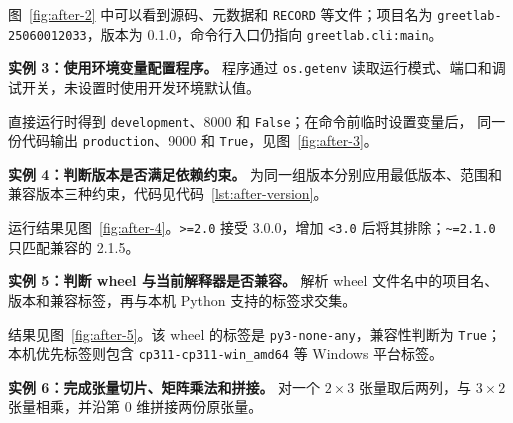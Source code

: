 \documentclass[12pt,a4paper,fontset=fandol]{ctexart}
\begin{document}
图~\ref{fig:after-2} 中可以看到源码、元数据和 \texttt{RECORD} 等文件；项目名为
\texttt{greetlab-25060012033}，版本为 0.1.0，命令行入口仍指向
\texttt{greetlab.cli:main}。


\noindent\textbf{实例 3：使用环境变量配置程序。}
程序通过 \texttt{os.getenv} 读取运行模式、端口和调试开关，未设置时使用开发环境默认值。



直接运行时得到 \texttt{development}、8000 和 \texttt{False}；在命令前临时设置变量后，
同一份代码输出 \texttt{production}、9000 和 \texttt{True}，见图~\ref{fig:after-3}。


\noindent\textbf{实例 4：判断版本是否满足依赖约束。}
为同一组版本分别应用最低版本、范围和兼容版本三种约束，代码见代码~\ref{lst:after-version}。



运行结果见图~\ref{fig:after-4}。\texttt{>=2.0} 接受 3.0.0，增加
\texttt{<3.0} 后将其排除；\texttt{\textasciitilde=2.1.0} 只匹配兼容的 2.1.5。


\noindent\textbf{实例 5：判断 wheel 与当前解释器是否兼容。}
解析 wheel 文件名中的项目名、版本和兼容标签，再与本机 Python 支持的标签求交集。



结果见图~\ref{fig:after-5}。该 wheel 的标签是 \texttt{py3-none-any}，兼容性判断为
\texttt{True}；本机优先标签则包含 \texttt{cp311-cp311-win\_amd64} 等 Windows 平台标签。


\noindent\textbf{实例 6：完成张量切片、矩阵乘法和拼接。}
对一个 \(2\times3\) 张量取后两列，与 \(3\times2\) 张量相乘，并沿第 0 维拼接两份原张量。
\end{document}
